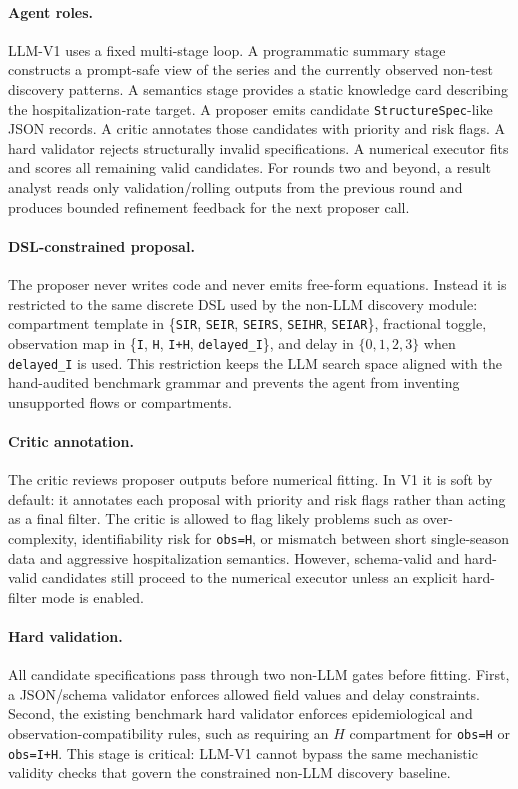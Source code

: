 \paragraph{Agent roles.}
LLM-V1 uses a fixed multi-stage loop. A programmatic summary stage constructs a
prompt-safe view of the series and the currently observed non-test discovery
patterns. A semantics stage provides a static knowledge card describing the
hospitalization-rate target. A proposer emits candidate
\texttt{StructureSpec}-like JSON records. A critic annotates those candidates
with priority and risk flags. A hard validator rejects structurally invalid
specifications. A numerical executor fits and scores all remaining valid
candidates. For rounds two and beyond, a result analyst reads only
validation/rolling outputs from the previous round and produces bounded
refinement feedback for the next proposer call.

\paragraph{DSL-constrained proposal.}
The proposer never writes code and never emits free-form equations. Instead it
is restricted to the same discrete DSL used by the non-LLM discovery module:
compartment template in
\{\texttt{SIR}, \texttt{SEIR}, \texttt{SEIRS}, \texttt{SEIHR}, \texttt{SEIAR}\},
fractional toggle, observation map in
\{\texttt{I}, \texttt{H}, \texttt{I+H}, \texttt{delayed\_I}\}, and delay in
$\{0,1,2,3\}$ when \texttt{delayed\_I} is used. This restriction keeps the LLM
search space aligned with the hand-audited benchmark grammar and prevents the
agent from inventing unsupported flows or compartments.

\paragraph{Critic annotation.}
The critic reviews proposer outputs before numerical fitting. In V1 it is soft
by default: it annotates each proposal with priority and risk flags rather than
acting as a final filter. The critic is allowed to flag likely problems such as
over-complexity, identifiability risk for \texttt{obs=H}, or mismatch between
short single-season data and aggressive hospitalization semantics. However,
schema-valid and hard-valid candidates still proceed to the numerical executor
unless an explicit hard-filter mode is enabled.

\paragraph{Hard validation.}
All candidate specifications pass through two non-LLM gates before fitting.
First, a JSON/schema validator enforces allowed field values and delay
constraints. Second, the existing benchmark hard validator enforces
epidemiological and observation-compatibility rules, such as requiring an $H$
compartment for \texttt{obs=H} or \texttt{obs=I+H}. This stage is critical:
LLM-V1 cannot bypass the same mechanistic validity checks that govern the
constrained non-LLM discovery baseline.

